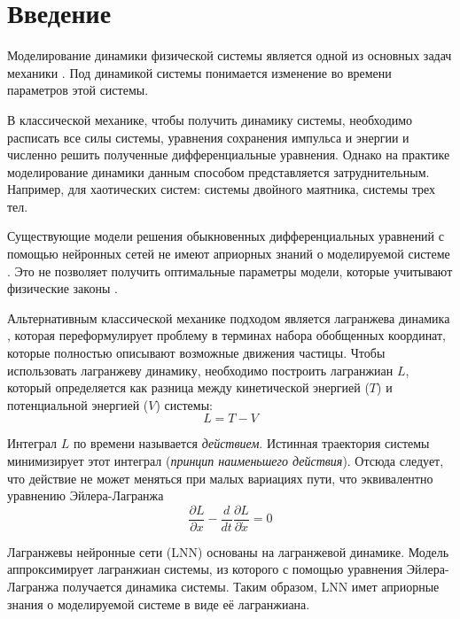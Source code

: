 \documentclass[12pt]{article}
\begin{document}
\newpage
\section{Введение}


Моделирование динамики физической системы является одной из основных задач механики \cite{goldstein:mechanics, arnold_mechanics}. Под динамикой системы понимается изменение во времени параметров этой системы.

В классической механике, чтобы получить динамику системы, необходимо расписать все силы системы, уравнения сохранения импульса и энергии и численно решить полученные дифференциальные уравнения. Однако на практике моделирование динамики данным способом представляется затруднительным. Например, для хаотических систем: системы двойного маятника, системы трех тел.

Существующие модели решения обыкновенных дифференциальных уравнений с помощью нейронных сетей не имеют априорных знаний о моделируемой системе \cite{712178, NEURIPS2018_69386f6b}. Это не позволяет получить оптимальные параметры модели, которые учитывают физические законы \cite{hnnpaper, Cranmer2020LagrangianNN, delan}.

Альтернативным классической механике подходом является лагранжева динамика \cite{goldstein:mechanics}, которая переформулирует проблему в терминах набора обобщенных координат, которые полностью описывают возможные движения частицы. Чтобы использовать лагранжеву динамику, необходимо построить лагранжиан $L$, который определяется как разница между кинетической энергией ($T$) и потенциальной энергией ($V$) системы:
$$L = T - V $$

Интеграл $L$ по времени называется \textit{действием}. Истинная траектория системы минимизирует этот интеграл (\textit{принцип наименьшего действия}). Отсюда следует, что действие не может меняться при малых вариациях пути, что эквивалентно уравнению Эйлера-Лагранжа
$$
\frac{\partial L}{\partial x}-\frac{d}{d t} \frac{\partial L}{\partial \dot{x}}=0
$$

Лагранжевы нейронные сети (LNN) \cite{Cranmer2020LagrangianNN, delan} основаны на лагранжевой динамике. Модель аппроксимирует лагранжиан системы, из которого с помощью уравнения Эйлера-Лагранжа получается динамика системы. Таким образом, LNN имет априорные знания о моделируемой системе в виде её лагранжиана. 
\end{document}
